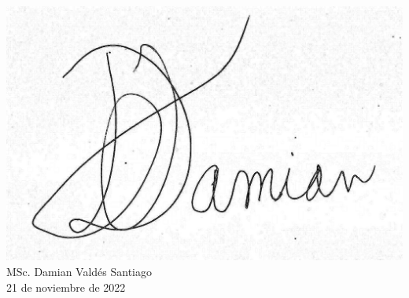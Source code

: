 \begin{opinion}
\begin{flushright}
\includegraphics[scale=0.2]{Graphics/firma.jpg}\\
MSc. Damian Valdés Santiago\\
21 de noviembre de 2022    
\end{flushright}

\end{opinion}